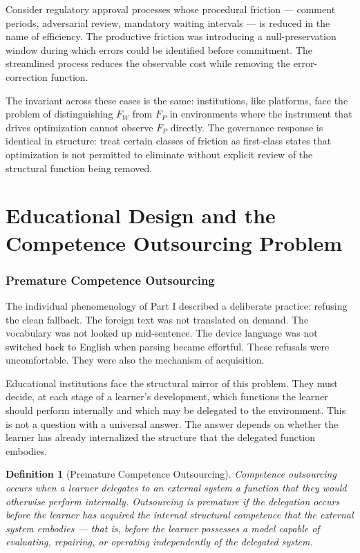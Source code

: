 \documentclass[11pt]{article}
\newtheorem{definition}{Definition}
\theoremstyle{remark}
\begin{document}
Consider regulatory approval processes whose procedural friction --- comment periods, adversarial review, mandatory waiting intervals --- is reduced in the name of efficiency. The productive friction was introducing a null-preservation window during which errors could be identified before commitment. The streamlined process reduces the observable cost while removing the error-correction function.

The invariant across these cases is the same: institutions, like platforms, face the problem of distinguishing $F_W$ from $F_P$ in environments where the instrument that drives optimization cannot observe $F_P$ directly. The governance response is identical in structure: treat certain classes of friction as first-class states that optimization is not permitted to eliminate without explicit review of the structural function being removed.


\part{Educational Design and the Competence Outsourcing Problem}
\label{part:education}

\section{Premature Competence Outsourcing}
\label{sec:outsourcing}

The individual phenomenology of Part I described a deliberate practice: refusing the clean fallback. The foreign text was not translated on demand. The vocabulary was not looked up mid-sentence. The device language was not switched back to English when parsing became effortful. These refusals were uncomfortable. They were also the mechanism of acquisition.

Educational institutions face the structural mirror of this problem. They must decide, at each stage of a learner's development, which functions the learner should perform internally and which may be delegated to the environment. This is not a question with a universal answer. The answer depends on whether the learner has already internalized the structure that the delegated function embodies.

\begin{definition}[Premature Competence Outsourcing]
\label{def:outsourcing}
Competence outsourcing occurs when a learner delegates to an external system a function that they would otherwise perform internally. Outsourcing is premature if the delegation occurs before the learner has acquired the internal structural competence that the external system embodies --- that is, before the learner possesses a model capable of evaluating, repairing, or operating independently of the delegated system.
\end{definition}
\end{document}
